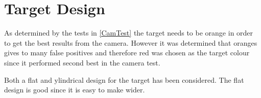 \section{Target Design}
As determined by the tests in \autoref{CamTest} the target needs to be orange in
order to get the best results from the camera. However it was determined that
oranges gives to many false positives and therefore red was chosen as the target
colour since it performed second best in the camera test.\nl

Both a flat and ylindrical design for the target has been considered. The flat
design is good since it is easy to make wider. 




